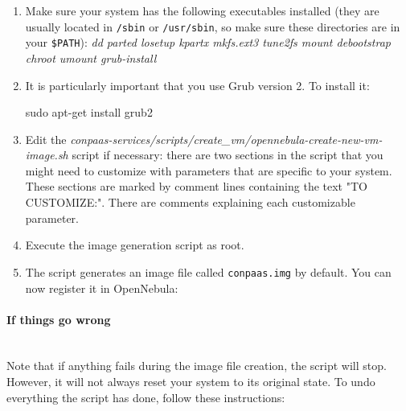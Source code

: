 \documentclass[10pt]{article}
\begin{document}
\begin{enumerate}
\item Make sure your system has the following executables installed
  (they are usually located in \verb+/sbin+ or \verb+/usr/sbin+, so
  make sure these directories are in your \verb+$PATH+): %
  \emph{dd parted losetup kpartx mkfs.ext3 tune2fs mount debootstrap
    chroot umount grub-install}
\item It is particularly important that you use Grub version 2. To
  install it:
  \begin{code}
  sudo apt-get install grub2
  \end{code}
\item Edit the
  \textit{conpaas-services/scripts/create\_vm/opennebula-create-new-vm-image.sh} script
  if necessary: there are two sections in the script that you might need
  to customize with parameters that are specific to your system. These
  sections are marked by comment lines containing the text "TO CUSTOMIZE:".
  There are comments explaining each customizable parameter. 
\item Execute the image generation script as root.
\item The script generates an image file called \verb+conpaas.img+
  by default. You can now register it in OpenNebula:

\vspace{10 mm}

\end{enumerate}

\paragraph{If things go wrong}~\\

Note that if anything fails during the image file creation, the script
will stop. However, it will not always reset your system to its
original state. To undo everything the script has done, follow these
instructions:
\end{document}
